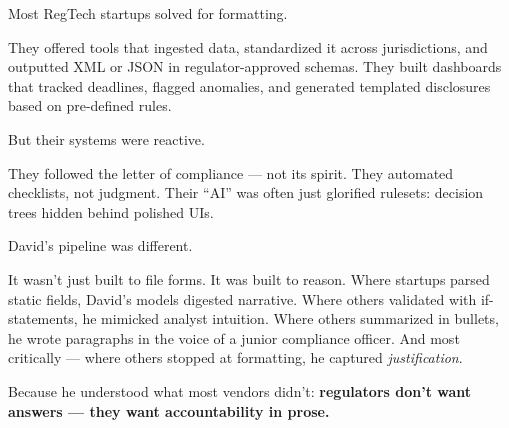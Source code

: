 Most RegTech startups solved for formatting.

They offered tools that ingested data, standardized it across jurisdictions, and outputted XML or JSON 
in regulator-approved schemas. They built dashboards that tracked deadlines, flagged anomalies, and 
generated templated disclosures based on pre-defined rules.

But their systems were reactive.

They followed the letter of compliance — not its spirit. They automated checklists, not judgment. Their 
“AI” was often just glorified rulesets: decision trees hidden behind polished UIs.

David’s pipeline was different.

It wasn’t just built to file forms. It was built to reason.
Where startups parsed static fields, David’s models digested narrative.
Where others validated with if-statements, he mimicked analyst intuition.
Where others summarized in bullets, he wrote paragraphs in the voice of a junior compliance officer.
And most critically — where others stopped at formatting, he captured \textit{justification}.

Because he understood what most vendors didn’t:
\textbf{regulators don’t want answers — they want accountability in prose.}

\medskip

